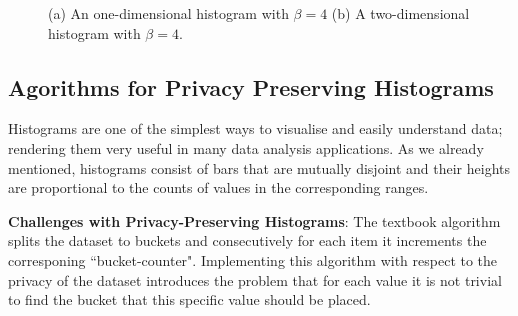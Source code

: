 \begin{figure}[h!]
    \centering

    \caption{(a) An one-dimensional histogram with $\beta = 4$
    (b) A two-dimensional histogram with $\beta = 4$.}
    \label{f:simple-hist}
\end{figure}





\subsection{Agorithms for Privacy Preserving Histograms}\label{ss:histogram-algos}
Histograms are one of the simplest ways to visualise and easily understand data; rendering them very useful in many data analysis applications. 
As we already mentioned, histograms consist of bars that are mutually disjoint and their heights are proportional to the counts of values in the corresponding ranges.

\textbf{Challenges with Privacy-Preserving Histograms}: The textbook algorithm splits the dataset to buckets and consecutively for each item it increments the corresponing ``bucket-counter".
Implementing this algorithm with respect to the privacy of the dataset introduces the problem that for each value it is not trivial to find the bucket that this specific value should be placed.


